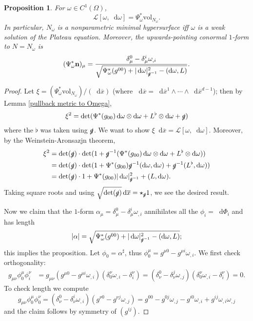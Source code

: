 \documentclass[reqno,12pt,letterpaper]{amsart}
\newcommand*\dif{\mathop{}\!\mathrm{d}}
\newcommand{\Lagrange}{\mathscr L}
\newcommand{\normal}{\mathbf n}
\newcommand{\vol}{\mathrm{vol}}
\newtheorem{proposition}[theorem]{Proposition}
\theoremstyle{definition}
\numberwithin{equation}{section}
\begin{document}
\begin{proposition}\label{construction of Plateau energy}
For $\omega \in C^1(\Omega)$,
$$\Lagrange[\omega, \dif \omega] = \Psi_\omega^* \vol_{N_\omega}.$$
In particular, $N_\omega$ is a nonparametric minimal hypersurface iff $\omega$ is a weak solution of the Plateau equation.
Moreover, the upwards-pointing conormal $1$-form to $N = N_\omega$ is
\begin{equation}\label{Josh helped}
(\Psi_\omega^* \normal)_\mu = \frac{\delta_\mu^0 - \delta_\mu^i \omega_{,i}}{\sqrt{\Psi_\omega^* (g^{00}) + |\dif \omega|_{\slashed g^{-1}}^2 - (\dif \omega, L)}}.
\end{equation}
\end{proposition}
\begin{proof}
Let $\xi = (\Psi_\omega^* \vol_{N_\omega})/(\dif \overline x)$ (where $\dif \overline x = \dif \overline x^1 \wedge \cdots \wedge \dif \overline x^{d - 1}$); then by Lemma \ref{pullback metric to Omega},
$$\xi^2 = \det(\Psi^* (g_{00}) \dif \omega \otimes \dif \omega + L^\flat \otimes \dif \omega + \slashed g)$$
where the $\flat$ was taken using $\slashed g$.
We want to show $\xi \dif \overline x = \Lagrange[\omega, \dif \omega]$.
Moreover, by the Weinstein-Aronsazjn theorem,
\begin{align*}
\xi^2 &= \det(\slashed g) \cdot \det(1 + \slashed g^{-1}(\Psi^* (g_{00}) \dif \omega \otimes \dif \omega + L^\flat \otimes \dif \omega))\\
&= \det (\slashed g) \cdot \det(1 + \Psi^*(g_{00}) \slashed g^{-1}(\dif \omega, \dif \omega) + \slashed g^{-1}(L^\flat, \dif \omega))\\
&= \det (\slashed g) \cdot 1 + \Psi^*(g_{00}) |\dif \omega|_{\slashed g^{-1}}^2 + (L, \dif \omega).
\end{align*}
Taking square roots and using $\sqrt{\det(\slashed g)} \dif \overline x = \star_{\slashed g} 1$, we see the desired result.

Now we claim that the $1$-form $\alpha_\mu = \delta_\mu^0 - \delta_\mu^i \omega_{,i}$
annihilates all the $\phi_i = \dif \Phi_i$ and has length 
$$|\alpha| = \sqrt{\Psi_\omega^* (g^{00}) + |\dif \omega|_{\slashed g^{-1}}^2 - (\dif \omega, L)};$$
this implies the proposition.
Let $\phi_0 = \alpha^\sharp$, thus $\phi_0^\mu = g^{\mu 0} - g^{\mu i} \omega_{,i}$. We first check orthogonality:
\begin{align*}
g_{\mu\nu} \phi_0^\mu \phi_i^\nu &= g_{\mu\nu} (g^{\mu 0} - g^{\mu i} \omega_{,i}) (\delta_0^\nu \omega_{,i} - \delta^\nu_i) = (\delta_\nu^0 - \delta^j_\nu \omega_{,j}) (\delta^\nu_0 \omega_{,i} - \delta^\nu_i) = 0.
\end{align*}
To check length we compute 
$$g_{\mu\nu} \phi_0^\mu \phi_0^\nu = (\delta_\nu^0 - \delta_\nu^i \omega_{,i}) (g^{\nu 0} - g^{\nu j} \omega_{,j}) = g^{00} - g^{0j} \omega_{,j} - g^{i0} \omega_{,i} + g^{ij} \omega_{,i} \omega_{,j}$$
and the claim follows by symmetry of $(g^{ij})$.
\end{proof}
\end{document}
